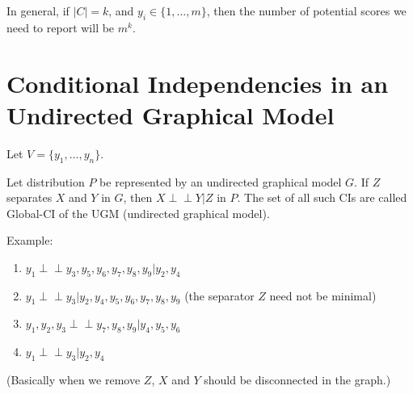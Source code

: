 \documentclass[a4paper,12pt]{article}
\begin{document}
In general, if $|C| = k$, and $y_i \in \{1, \dots, m\}$, then the number of potential scores we need to report will be $m^k$.


\section{Conditional Independencies in an Undirected Graphical Model}
Let $V = \{y_1, \dots, y_n\}$.

Let distribution $P$ be represented by an undirected graphical model $G$. If $Z$ separates $X$ and $Y$ in $G$, then $X \perp\!\!\!\perp Y | Z$ in $P$. The set of all such CIs are called Global-CI of the UGM (undirected graphical model).

\begin{minipage}{0.55\textwidth} 
    Example:
    \begin{enumerate}
        \item $y_1 \perp\!\!\!\perp y_3, y_5, y_6, y_7, y_8, y_9 | y_2, y_4$
        \item $y_1 \perp\!\!\!\perp y_3|y_2,y_4,y_5,y_6,y_7,y_8,y_9$ (the separator $Z$ need not be minimal)
        \item $y_1,y_2,y_3 \perp\!\!\!\perp y_7,y_8,y_9|y_4,y_5,y_6$
        \item $y_1 \perp\!\!\!\perp y_3|y_2,y_4$
    \end{enumerate}

    (Basically when we remove $Z$, $X$ and $Y$ should be disconnected in the graph.)

\end{minipage}
\hfill 
\begin{minipage}{0.40\textwidth} 
\end{minipage}
\end{document}
